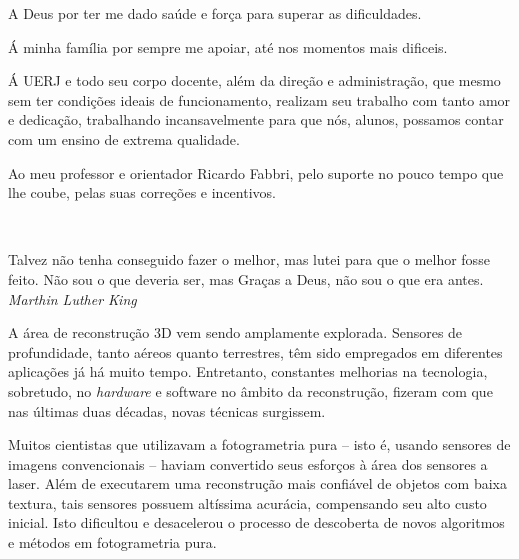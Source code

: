 \documentclass[a4paper,12pt,oneside,onecolumn,final,fleqn]{repUERJ}
\theoremstyle{plain}
\theoremstyle{definition}
\begin{document}



A Deus por ter me dado saúde e força para superar as dificuldades.


Á minha família por sempre me apoiar, até nos momentos mais dificeis.


Á UERJ e todo seu corpo docente, além da direção e administração, que mesmo sem ter condições ideais de funcionamento, realizam seu trabalho com tanto amor e dedicação, trabalhando incansavelmente para que nós, alunos, possamos contar com um ensino de extrema qualidade.


Ao meu professor e orientador Ricardo Fabbri, pelo suporte no pouco tempo que lhe coube, pelas suas correções e incentivos.


\pretextualchapter{}

  \vfill\
  \begin{flushright}
 Talvez não tenha conseguido fazer o melhor, mas lutei para que o melhor fosse feito. Não sou o que deveria ser, mas Graças a Deus, não sou o que era antes. \\
    \textsl{Marthin Luther King}
  \end{flushright}




A área de reconstrução 3D vem sendo amplamente explorada. Sensores de
profundidade, tanto aéreos quanto terrestres, têm sido empregados em diferentes
aplicações já há muito tempo. Entretanto, constantes melhorias na tecnologia, sobretudo, no
\emph{hardware} e software no âmbito da reconstrução, fizeram com que
nas últimas duas décadas, novas técnicas surgissem.

Muitos cientistas que utilizavam a fotogrametria pura -- isto é, usando sensores de 
imagens convencionais -- haviam convertido seus esforços à área dos sensores a laser. Além de
executarem uma reconstrução mais confiável de objetos com baixa
textura, tais sensores possuem altíssima acurácia, compensando seu alto
custo inicial.  Isto dificultou e desacelerou o processo de descoberta de novos
algoritmos e métodos em fotogrametria pura.
\end{document}
